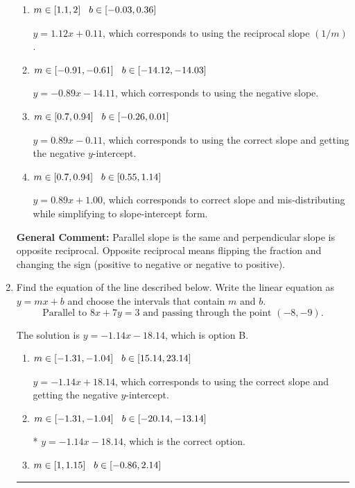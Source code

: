 \documentclass{extbook}[14pt]
\newcommand{\litem}[1]{\item #1

\rule{\textwidth}{0.4pt}}
\begin{document}
\begin{enumerate}
{\begin{enumerate}[label=\Alph*.]
* $y = 0.89x + 0.11$, which is the correct option.
\item \( m \in [1.1, 2] \hspace*{3mm} b \in [-0.03, 0.36] \)

 $y = 1.12x + 0.11$, which corresponds to using the reciprocal slope $(1/m)$.
\item \( m \in [-0.91, -0.61] \hspace*{3mm} b \in [-14.12, -14.03] \)

 $y = -0.89x - 14.11$, which corresponds to using the negative slope.
\item \( m \in [0.7, 0.94] \hspace*{3mm} b \in [-0.26, 0.01] \)

 $y = 0.89x - 0.11$, which corresponds to using the correct slope and getting the negative $y$-intercept.
\item \( m \in [0.7, 0.94] \hspace*{3mm} b \in [0.55, 1.14] \)

 $y = 0.89x + 1.00$, which corresponds to correct slope and mis-distributing while simplifying to slope-intercept form.
\end{enumerate}

\textbf{General Comment:} Parallel slope is the same and perpendicular slope is opposite reciprocal. Opposite reciprocal means flipping the fraction and changing the sign (positive to negative or negative to positive).
}
\litem{
Find the equation of the line described below. Write the linear equation as $ y=mx+b $ and choose the intervals that contain $m$ and $b$.
\[ \text{Parallel to } 8 x + 7 y = 3 \text{ and passing through the point } (-8, -9). \]

The solution is \( y = -1.14x - 18.14 \), which is option B.\begin{enumerate}[label=\Alph*.]
\item \( m \in [-1.31, -1.04] \hspace*{3mm} b \in [15.14, 23.14] \)

 $y = -1.14x + 18.14$, which corresponds to using the correct slope and getting the negative $y$-intercept.
\item \( m \in [-1.31, -1.04] \hspace*{3mm} b \in [-20.14, -13.14] \)

* $y = -1.14x - 18.14$, which is the correct option.
\item \( m \in [1, 1.15] \hspace*{3mm} b \in [-0.86, 2.14] \)


\end{enumerate}}
\end{enumerate}
\end{document}
